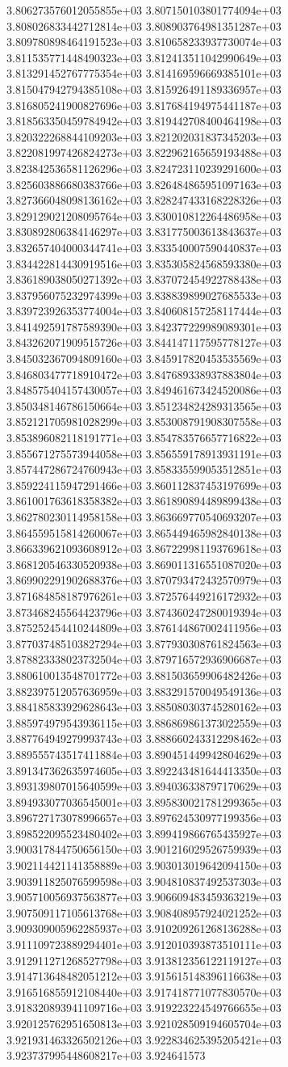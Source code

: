 3.806273576012055855e+03	3.807150103801774094e+03	3.808026833442712814e+03	3.808903764981351287e+03	3.809780898464191523e+03	3.810658233937730074e+03	3.811535771448490323e+03	3.812413511042990649e+03	3.813291452767775354e+03	3.814169596669385101e+03	3.815047942794385108e+03	3.815926491189336957e+03	3.816805241900827696e+03	3.817684194975441187e+03	3.818563350459784942e+03	3.819442708400464198e+03	3.820322268844109203e+03	3.821202031837345203e+03	3.822081997426824273e+03	3.822962165659193488e+03	3.823842536581126296e+03	3.824723110239291600e+03	3.825603886680383766e+03	3.826484865951097163e+03	3.827366048098136162e+03	3.828247433168228326e+03	3.829129021208095764e+03	3.830010812264486958e+03	3.830892806384146297e+03	3.831775003613843637e+03	3.832657404000344741e+03	3.833540007590440837e+03	3.834422814430919516e+03	3.835305824568593380e+03	3.836189038050271392e+03	3.837072454922788438e+03	3.837956075232974399e+03	3.838839899027685533e+03	3.839723926353774004e+03	3.840608157258117444e+03	3.841492591787589390e+03	3.842377229989089301e+03	3.843262071909515726e+03	3.844147117595778127e+03	3.845032367094809160e+03	3.845917820453535569e+03	3.846803477718910472e+03	3.847689338937883804e+03	3.848575404157430057e+03	3.849461673424520086e+03	3.850348146786150664e+03	3.851234824289313565e+03	3.852121705981028299e+03	3.853008791908307558e+03	3.853896082118191771e+03	3.854783576657716822e+03	3.855671275573944058e+03	3.856559178913931191e+03	3.857447286724760943e+03	3.858335599053512851e+03	3.859224115947291466e+03	3.860112837453197699e+03	3.861001763618358382e+03	3.861890894489899438e+03	3.862780230114958158e+03	3.863669770540693207e+03	3.864559515814260067e+03	3.865449465982840138e+03	3.866339621093608912e+03	3.867229981193769618e+03	3.868120546330520938e+03	3.869011316551087020e+03	3.869902291902688376e+03	3.870793472432570979e+03	3.871684858187976261e+03	3.872576449216172932e+03	3.873468245564423796e+03	3.874360247280019394e+03	3.875252454410244809e+03	3.876144867002411956e+03	3.877037485103827294e+03	3.877930308761824563e+03	3.878823338023732504e+03	3.879716572936906687e+03	3.880610013548701772e+03	3.881503659906482426e+03	3.882397512057636959e+03	3.883291570049549136e+03	3.884185833929628643e+03	3.885080303745280162e+03	3.885974979543936115e+03	3.886869861373022559e+03	3.887764949279993743e+03	3.888660243312298462e+03	3.889555743517411884e+03	3.890451449942804629e+03	3.891347362635974605e+03	3.892243481644413350e+03	3.893139807015640599e+03	3.894036338797170629e+03	3.894933077036545001e+03	3.895830021781299365e+03	3.896727173078996657e+03	3.897624530977199356e+03	3.898522095523480402e+03	3.899419866765435927e+03	3.900317844750656150e+03	3.901216029526759939e+03	3.902114421141358889e+03	3.903013019642094150e+03	3.903911825076599598e+03	3.904810837492537303e+03	3.905710056937563877e+03	3.906609483459363219e+03	3.907509117105613768e+03	3.908408957924021252e+03	3.909309005962285937e+03	3.910209261268136288e+03	3.911109723889294401e+03	3.912010393873510111e+03	3.912911271268527798e+03	3.913812356122119127e+03	3.914713648482051212e+03	3.915615148396116638e+03	3.916516855912108440e+03	3.917418771077830570e+03	3.918320893941109716e+03	3.919223224549766655e+03	3.920125762951650813e+03	3.921028509194605704e+03	3.921931463326502126e+03	3.922834625395205421e+03	3.923737995448608217e+03	3.924641573